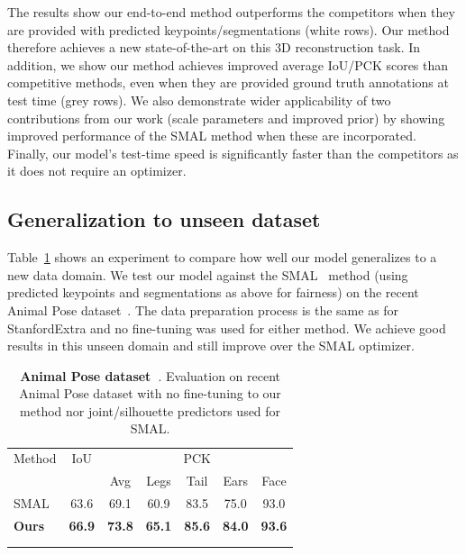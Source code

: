 The results show our end-to-end method outperforms the competitors when they are provided with predicted keypoints/segmentations (white rows). Our method therefore achieves a new state-of-the-art on this 3D reconstruction task. In addition, we show our method achieves improved average IoU/PCK scores than competitive methods, even when they are provided ground truth annotations at test time (grey rows). We also demonstrate wider applicability of two contributions from our work (scale parameters and improved prior) by showing improved performance of the SMAL method when these are incorporated. Finally, our model's test-time speed is significantly faster than the competitors as it does not require an optimizer.




\subsection{Generalization to unseen dataset}

Table~\ref{tab:animalpose} shows an experiment to compare how well our model generalizes to a new data domain. We test our model against the SMAL~\cite{zuffi2017menagerie} method (using predicted keypoints and segmentations as above for fairness) on the recent Animal Pose dataset~\cite{animalpose}. The data preparation process is the same as for StanfordExtra and no fine-tuning was used for either method. We achieve good results in this unseen domain and still improve over the SMAL optimizer.

\begin{table}
\begin{tabular}{@{}lcccccc@{}}
\toprule
\multicolumn{1}{l}{Method} & 
\multicolumn{1}{c}{IoU} & 
\multicolumn{5}{c}{PCK} \\
\multicolumn{2}{c}{} &
\multicolumn{1}{c}{Avg} &
\multicolumn{1}{c}{Legs} &
\multicolumn{1}{c}{Tail} &
\multicolumn{1}{c}{Ears} &
\multicolumn{1}{c}{Face} \\
\midrule
SMAL~\cite{zuffi2017menagerie} & 63.6 & 69.1 & 60.9 & 83.5 & 75.0 & 93.0 \\
\textbf{Ours} & \textbf{66.9} & \textbf{73.8} & \textbf{65.1} & \textbf{85.6} & \textbf{84.0} & \textbf{93.6} \\
\bottomrule
\multicolumn{7}{c}{} \\
\multicolumn{7}{c}{}

\end{tabular}
\caption{
    \label{tab:animalpose}
    \textbf{Animal Pose dataset~\cite{animalpose}}. Evaluation on recent Animal Pose dataset with no fine-tuning to our method nor joint/silhouette predictors used for SMAL.}
\end{table}

